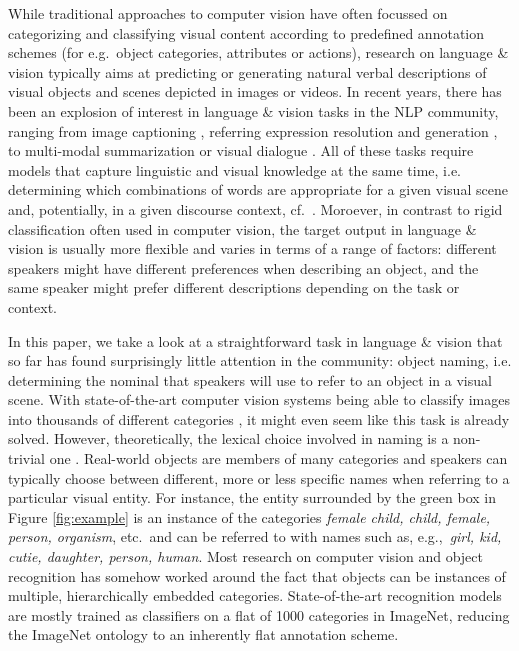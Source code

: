 \documentclass[runningheads]{llncs}
\begin{document}
While traditional approaches to computer vision have often focussed on categorizing and classifying visual content according to predefined annotation schemes (for e.g.\ object categories, attributes or actions), research on language \& vision typically aims at predicting or generating natural verbal descriptions of visual objects and scenes depicted in images or videos.
In recent years, there has been an explosion of interest in language \& vision tasks in the NLP community, ranging from image captioning \cite{fangetal:2015,devlin:imcaqui,chen2015mind,vinyals:show,Bernardietal:automatic}, referring expression resolution and generation \cite{Kazemzadeh2014,mao15,Yu2016,schlazar:acl16}, to multi-modal summarization or visual dialogue \cite{das2017visual,vries2017guesswhat}.
All of these tasks require models that capture linguistic and visual knowledge at the same time, i.e. determining which combinations of words are appropriate for a given visual scene and, potentially, in a given discourse context, cf.\ \cite{vries2017guesswhat}.
Moroever, in contrast to rigid classification often used in computer vision, the target output in language \& vision is usually more flexible and varies in terms of a range of factors:  different speakers might have different preferences when describing an object, and the same speaker might prefer different descriptions depending on the task or context.

In this paper, we take a look at a straightforward task in language \& vision that so far has found surprisingly little attention in the community: object naming, i.e. determining the nominal that speakers will use to refer to an object in a visual scene. 
With state-of-the-art computer vision systems being able to classify images into thousands of different categories \cite{googlenet}, it might even seem like this task is already solved.
However, theoretically, the lexical choice involved in naming is a non-trivial one \cite{brown1958shall}.
Real-world objects are members of many categories and speakers can typically choose between different, more or less specific names when referring to a particular visual entity. 
For instance, the entity surrounded by the green box in Figure \ref{fig:example} is an instance of the categories \textit{female child, child, female, person, organism}, etc.\  and can be referred to with names such as, e.g.,\ \textit{girl, kid, cutie, daughter, person, human}.
Most research on computer vision and object recognition has somehow worked around the fact that objects can be instances of multiple, hierarchically embedded categories. 
State-of-the-art recognition models are mostly trained as classifiers on a flat of 1000 categories in ImageNet, reducing the ImageNet ontology to an inherently flat annotation scheme.
\end{document}
